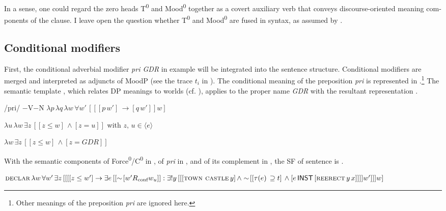 \documentclass[output=paper,colorlinks,citecolor=brown]{langscibook}
\begin{document}
\begin{otherlanguage}{english}
In a sense, one could regard the zero heads T\textsuperscript{0} and Mood\textsuperscript{0} together as a covert auxiliary verb that conveys discourse-oriented meaning components of the clause. I leave open the question whether  T\textsuperscript{0} and Mood\textsuperscript{0} are fused in syntax, as assumed by \textcite{Pitsch2014}.

\subsection{Conditional modifiers}

First, the conditional adverbial modifier \textit{pri GDR} in example  will be integrated into the sentence structure. Conditional modifiers are merged and interpreted as adjuncts of MoodP (see the trace $t_{i}$ in ). The conditional meaning of the preposition \textit{pri} is represented in .\footnote{Other meanings of the preposition \textit{pri} are ignored here.
} The semantic template , which relates DP meanings to worlds (cf. \citealt{Schwarz2012}), applies to the proper name \textit{GDR} with the resultant representation .


\begin{exe}
\ex	\label{ex:16:21}
\begin{xlist}
	\ex /pri/
    \ex $-$V$-$N
    \ex $\lambda p \, \lambda q \, \lambda w \, \forall w' \, [[[p \, w'] \, \to [q \, w']]w]   $ \label{ex:16:21c}
\end{xlist}
\end{exe}

\begin{exe}
\ex  \label{ex:16:22}
$\lambda u \, \lambda w \, \exists z \, [[z \le w] \, \wedge [z=u]]  $
\newline
with $z, \, u \in \langle e \rangle $
\end{exe}

\begin{exe}
\ex  \label{ex:16:23}
$\lambda w \, \exists z \, [[z \le w] \, \wedge [z=GDR]] $
\end{exe}

\noindent With the semantic components of Force\textsuperscript{0}/C\textsuperscript{0} in , of \textit{pri} in , and of its complement in , the SF of sentence  is .

\begin{exe}
\ex  $\textsc{declar} \, \lambda w \, \forall w' \, \exists z \, [[[[z \le w'] %
\newline
\to \exists e \, [[\sim \negthinspace [w'R_\text{conf}w_{u}]] : \exists ! y \, [[[\textsc{town castle} \, y]  \, \wedge \sim \negthinspace [[\tau (e)  \, \supseteq t] \, \wedge  
\newline
[e \, \cnst{inst} \, [\textsc{reerect} \, y \, x]]]]w']]]w]$ \label{ex:16:24}
\end{exe}


\end{otherlanguage}
\end{document}
